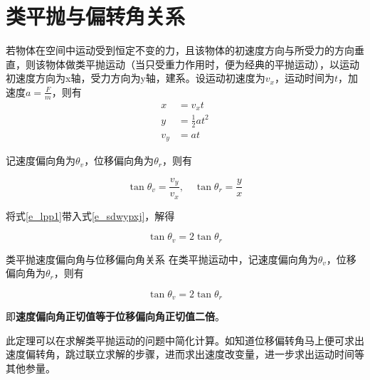 \section{类平抛与偏转角关系}

若物体在空间中运动受到恒定不变的力，且该物体的初速度方向与所受力的方向垂直，则该物体做类平抛运动（当只受重力作用时，便为经典的平抛运动），以运动初速度方向为x轴，受力方向为y轴，建系。设运动初速度为$v_x$，运动时间为$t$，加速度$a = \frac{F}{m}$，则有
\begin{equation}
\begin{aligned}
x &= v_x t \\
y &= \frac{1}{2} a t^2 \\
v_y &= a t
\end{aligned}
\label{e_lpp1}
\end{equation}

记速度偏向角为$\theta_v$，位移偏向角为$\theta_r$，则有



\begin{equation}
\tan{\theta_v} = \frac{v_y}{v_x} ,\quad \tan{\theta_r} = \frac{y}{x}
\label{e_sdwypxj}
\end{equation}

将式\eqref{e_lpp1}带入式\eqref{e_sdwypxj}，解得

\begin{equation}
\boxed{\tan{\theta_v} = 2 \tan{\theta_r}}
\end{equation}

\begin{theo}{类平抛速度偏向角与位移偏向角关系}{}
在类平抛运动中，记速度偏向角为$\theta_v$，位移偏向角为$\theta_r$，则有

$$\tan{\theta_v} = 2 \tan{\theta_r}$$

即\textbf{速度偏向角正切值等于位移偏向角正切值二倍}。
\end{theo}

此定理可以在求解类平抛运动的问题中简化计算。如知道位移偏转角马上便可求出速度偏转角，跳过联立求解的步骤，进而求出速度改变量，进一步求出运动时间等其他参量。

